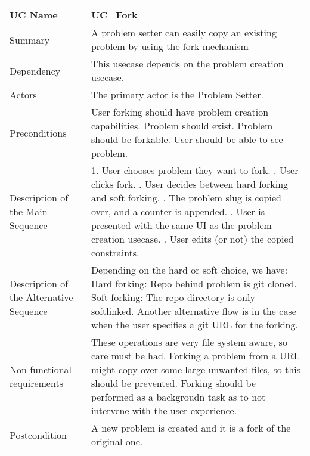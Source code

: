 \begin{table}[htbp]
\centering
\begin{tabularx}{\textwidth}{|l|X|}
\hline
UC Name & UC\_Fork \\ \hline

Summary &  A problem setter can easily copy an existing problem by using the fork mechanism \\ \hline

Dependency & This usecase depends on the problem creation usecase. \\ \hline

Actors & The primary actor is the Problem Setter. \\ \hline

Preconditions & \- User forking should have problem creation capabilities. \newline \- Problem should exist. \newline \- Problem should be forkable. \newline \- User should be able to see problem. \\ \hline

Description of the Main Sequence & 1. User chooses problem they want to fork. \newline 2. User clicks fork. \newline 3. User decides between hard forking and soft forking. \newline 4. The problem slug is copied over, and a counter is appended. \newline 5. User is presented with the same UI as the problem creation usecase. \newline 6. User edits (or not) the copied constraints. \\ \hline

Description of the Alternative Sequence & Depending on the hard or soft choice, we have: \newline \- Hard forking: Repo behind problem is git cloned. \newline \- Soft forking: The repo directory is only softlinked. \newline Another alternative flow is in the case when the user specifies a git URL for the forking. \\ \hline

Non functional requirements & \- These operations are very file system aware, so care must be had. \newline \- Forking a problem from a URL might copy over some large unwanted files, so this should be prevented. \newline \- Forking should be performed as a backgroudn task as to not intervene with the user experience. \\ \hline

Postcondition & A new problem is created and it is a fork of the original one. \\ \hline

\end{tabularx}
\end{table}

